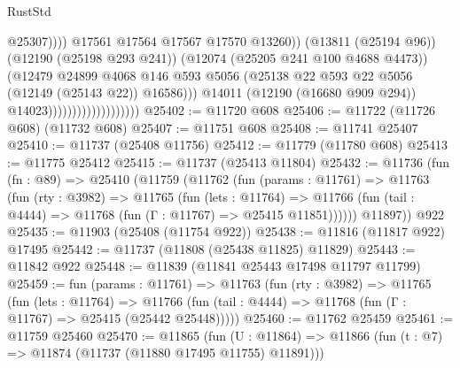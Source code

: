 \begin{lexlean}{RustStd}
\begin{coremodule}
                                                        @25307))))
                                                @17561
                                                @17564
                                                @17567
                                                @17570
                                                @13260))
                                            (@13811 (@25194 @96))
                                            (@12190 (@25198 @293 @241))
                                            (@12074 (@25205 @241 @100 @4688 @4473))
                                            (@12479
                                              @24899
                                              @4068
                                              @146
                                              @593
                                              @5056
                                              (@25138
                                                @22
                                                @593
                                                @22
                                                @5056
                                                (@12149 (@25143 @22))
                                                @16586)))
                                          @14011
                                          (@12190 (@16680 @909 @294))
                                          @14023)))))))))))))))))))
@25402 := @11720 @608
@25406 := @11722 (@11726 @608) (@11732 @608)
@25407 := @11751 @608
@25408 := @11741 @25407
@25410 := @11737 (@25408 @11756)
@25412 := @11779 (@11780 @608)
@25413 := @11775 @25412
@25415 := @11737 (@25413 @11804)
@25432 := @11736
    (fun (fn : @89) =>
    @25410
      (@11759
        (@11762
          (fun (params : @11761) =>
          @11763
            (fun (rty : @3982) =>
            @11765
              (fun (lets : @11764) =>
              @11766 (fun (tail : @4444) => @11768 (fun (Γ : @11767) => @25415 @11851))))))
        @11897))
    @922
@25435 := @11903 (@25408 (@11754 @922))
@25438 := @11816 (@11817 @922) @17495
@25442 := @11737 (@11808 (@25438 @11825) @11829)
@25443 := @11842 @922
@25448 := @11839 (@11841 @25443 @17498 @11797 @11799)
@25459 := fun (params : @11761) =>
  @11763
    (fun (rty : @3982) =>
    @11765
      (fun (lets : @11764) =>
      @11766 (fun (tail : @4444) => @11768 (fun (Γ : @11767) => @25415 (@25442 @25448)))))
@25460 := @11762 @25459
@25461 := @11759 @25460
@25470 := @11865
    (fun (U : @11864) => @11866 (fun (t : @7) => @11874 (@11737 (@11880 @17495 @11755) @11891)))

\end{coremodule}
\end{lexlean}
